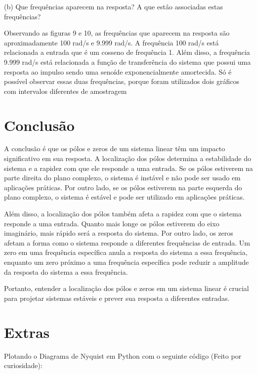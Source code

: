 \documentclass[10pt]{article}
\begin{document}
(b) Que frequências aparecem na resposta? A que estâo associadas estas frequências?

\quad Observando as figuras 9 e 10, as frequências que aparecem na resposta são aproximadamente 100 rad/s e 9.999 rad/s.
A frequência 100 rad/s está relacionada a entrada que é um cosseno de frequência 1.
Além disso, a frequência 9.999 rad/s está relacionada a função de transferência do sistema
que possui uma resposta ao impulso sendo uma senoíde exponencialmente amortecida.
Só é possível observar essas duas frequências,
porque foram utilizados dois gráficos com intervalos diferentes de amostragem


\newpage

\section{Conclusão}

\quad A conclusão é que os pólos e zeros de um sistema linear têm um impacto significativo em sua resposta.
A localização dos pólos determina a estabilidade do sistema e a rapidez com que ele responde a uma entrada.
Se os pólos estiverem na parte direita do plano complexo, o sistema é instável e não pode ser usado em aplicações práticas.
Por outro lado, se os pólos estiverem na parte esquerda do plano complexo, o sistema é estável e pode ser utilizado em aplicações práticas.

\quad Além disso, a localização dos pólos também afeta a rapidez com que o sistema responde a uma entrada.
Quanto mais longe os pólos estiverem do eixo imaginário, mais rápido será a resposta do sistema. Por outro lado,
os zeros afetam a forma como o sistema responde a diferentes frequências de entrada.
Um zero em uma frequência específica anula a resposta do sistema a essa frequência,
enquanto um zero próximo a uma frequência específica pode reduzir a amplitude da resposta do sistema a essa frequência.

\quad Portanto, entender a localização dos pólos e zeros em um sistema linear é crucial para projetar sistemas estáveis e prever sua resposta a diferentes entradas.
\newpage

\section{Extras}

\quad Plotando o Diagrama de Nyquist em Python com o seguinte código (Feito por curiosidade):
\end{document}
